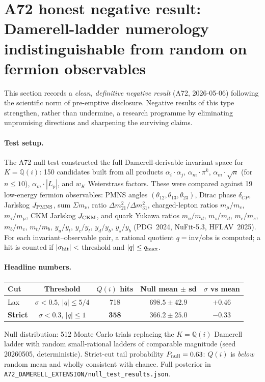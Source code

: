 \documentclass[a4paper,11pt]{article}
\newcommand{\Qi}{\mathbb{Q}(i)}
\theoremstyle{definition}
\theoremstyle{remark}
\begin{document}
\section{A72 honest negative result: Damerell-ladder numerology
         indistinguishable from random on fermion observables}
\label{sec:A72}

This section records a \emph{clean, definitive negative result}
(A72, 2026-05-06) following the scientific norm of pre-emptive
disclosure.  Negative results of this type strengthen, rather
than undermine, a research programme by eliminating unpromising
directions and sharpening the surviving claims.

\paragraph{Test setup.}
The A72 null test constructed the full Damerell-derivable
invariant space for $K=\Qi$: 150 candidates built from all
products $\alpha_i\cdot\alpha_j$, $\alpha_m\cdot\pi^k$,
$\alpha_m\cdot\sqrt{n}$ (for $n\le 10$), $\alpha_m\cdot|L_p|$,
and $w_K$ Weierstrass factors.  These were compared against
19 low-energy fermion observables:
PMNS angles $(\theta_{12},\theta_{13},\theta_{23})$,
Dirac phase $\delta_{CP}$, Jarlskog $J_{\rm PMNS}$,
sum $\Sigma m_\nu$, ratio $\Delta m^2_{21}/\Delta m^2_{31}$,
charged-lepton ratios $m_\mu/m_e$, $m_\tau/m_\mu$,
CKM Jarlskog $J_{\rm CKM}$, and quark Yukawa ratios
$m_u/m_d$, $m_s/m_d$, $m_c/m_s$, $m_b/m_c$, $m_t/m_b$,
$y_u/y_t$, $y_c/y_t$, $y_d/y_b$, $y_s/y_b$
(PDG~2024, NuFit-5.3, HFLAV~2025).
For each invariant--observable pair, a rational quotient
$q = \text{inv}/\text{obs}$ is computed; a hit is counted
if $|\sigma_{\rm hit}|<$ threshold and $|q|\le q_{\rm max}$.

\paragraph{Headline numbers.}
\begin{center}
\begin{tabular}{lcccc}
\toprule
Cut & Threshold & $Q(i)$ hits & Null mean $\pm$ sd
    & $\sigma$ vs mean \\
\midrule
Lax & $\sigma<0.5$, $|q|\le 5/4$ & 718 & $698.5\pm42.9$ & $+0.46$ \\
\textbf{Strict} & $\sigma<0.3$, $|q|\le 1$
    & \textbf{358} & $366.2\pm25.0$
    & $\mathbf{-0.33}$ \\
\bottomrule
\end{tabular}
\end{center}
Null distribution: 512 Monte Carlo trials replacing the
$K=\Qi$ Damerell ladder with random small-rational ladders of
comparable magnitude (seed 20260505, deterministic).
Strict-cut tail probability $P_{\rm null}=0.63$:
$Q(i)$ is \emph{below} random mean and wholly consistent
with chance.  Full posterior in
\texttt{A72\_DAMERELL\_EXTENSION/null\_test\_results.json}.
\end{document}
